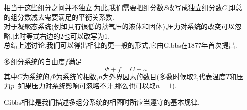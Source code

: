 \documentclass{ctexart}
\begin{document}
相当于这些组分之间并不独立.为此,我们需要把组分数$S$改写成独立组分数$C$,即总的组分数减去需要满足的平衡关系数.\\
\indent 对于凝聚态系统(例如具有很低的蒸气压的液体和固体),压力对系统的改变可以忽略,此时等式右边的$2$也可以改写为$1$.\\
\indent 总结上述讨论,我们可以得出相律的更一般的形式,它由Gibbs在1877年首次提出.
\begin{theorem}[4D.1.2 Gibbs相律]
    多组分系统的自由度$f$满足
    \[\varPhi+f=C+n\]
    其中$C$为系统的,$\varPhi$为系统的相数,$n$为外界因素的数目(多数时候取$2$,代表温度$T$和压力$p$;%
    如果压力对系统影响可忽略不计,那么也可以取$n=1$).
\end{theorem}
Gibbs相律是我们描述多组分系统的相图时所应当遵守的基本规律.
\end{document}
